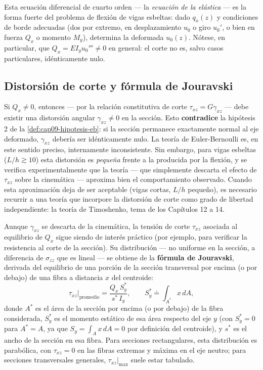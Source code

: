 Esta ecuación diferencial de cuarto orden --- la \emph{ecuación de la elástica} --- es la forma fuerte del problema de flexión de vigas esbeltas: dado $q_x(z)$ y condiciones de borde adecuadas (dos por extremo, en desplazamiento $u_0$ o giro $u_0'$, o bien en fuerza $Q_x$ o momento $M_y$), determina la deformada $u_0(z)$. Nótese, en particular, que $Q_x=EI_yu_0'''\neq0$ en general: el corte no es, salvo casos particulares, idénticamente nulo.

\subsection{Distorsión de corte y fórmula de Jouravski}
\label{sec:cap09-corte-jouravski}

\begin{observacion}
Si $Q_x\neq0$, entonces --- por la relación constitutiva de corte $\tau_{xz}=G\gamma_{xz}$ --- debe existir una distorsión angular $\gamma_{xz}\neq0$ en la sección. Esto \textbf{contradice} la hipótesis 2 de la \cref{def:cap09-hipotesis-eb}: si la sección permanece exactamente normal al eje deformado, $\gamma_{xz}$ debería ser idénticamente nulo. La teoría de Euler-Bernoulli es, en este sentido preciso, internamente inconsistente. Sin embargo, para vigas esbeltas ($L/h\gtrsim10$) esta distorsión es \emph{pequeña} frente a la producida por la flexión, y se verifica experimentalmente que la teoría --- que simplemente descarta el efecto de $\tau_{xz}$ sobre la cinemática --- aproxima bien el comportamiento observado. Cuando esta aproximación deja de ser aceptable (vigas cortas, $L/h$ pequeño), es necesario recurrir a una teoría que incorpore la distorsión de corte como grado de libertad independiente: la teoría de Timoshenko, tema de los Capítulos 12 a 14.
\end{observacion}

Aunque $\gamma_{xz}$ se descarta de la cinemática, la tensión de corte $\tau_{xz}$ asociada al equilibrio de $Q_x$ sigue siendo de interés práctico (por ejemplo, para verificar la resistencia al corte de la sección). Su distribución --- no uniforme en la sección, a diferencia de $\sigma_{zz}$ que es lineal --- se obtiene de la \textbf{fórmula de Jouravski}, derivada del equilibrio de una porción de la sección transversal por encima (o por debajo) de una fibra a distancia $x$ del centroide:
\[
\tau_{xz}\Big|_{\text{promedio}} = \frac{Q_x\,S_y^*}{s^*\,I_y} , \qquad S_y^* \doteq \int_{A^*} x\,dA ,
\]
donde $A^*$ es el área de la sección por encima (o por debajo) de la fibra considerada, $S_y^*$ es el momento estático de esa área respecto del eje $y$ (con $S_y^*=0$ para $A^*=A$, ya que $S_y=\int_A x\,dA=0$ por definición del centroide), y $s^*$ es el ancho de la sección en esa fibra. Para secciones rectangulares, esta distribución es parabólica, con $\tau_{xz}=0$ en las fibras extremas y máxima en el eje neutro; para secciones transversales generales, $\tau_{xz}|_{\max}$ suele estar tabulado.

